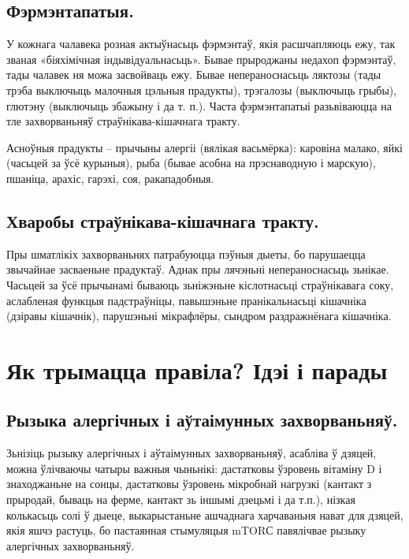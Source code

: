 \subsection{Фэрмэнтапатыя.}
У кожнага чалавека розная актыўнасьць фэрмэнтаў, якія расшчапляюць ежу, так званая «біяхімічная індывідуальнасьць». Бывае прыроджаны недахоп фэрмэнтаў, тады чалавек ня можа засвойваць ежу. Бывае непераноснасьць ляктозы (тады трэба выключыць малочныя цэльныя прадукты), трэгалозы (выключыць грыбы), глютэну (выключыць збажыну і да т. п.). Часта фэрмэнтапатыі разьвіваюцца на тле захворваньняў страўнікава-кішачнага тракту.

Асноўныя прадукты – прычыны алергіі (вялікая васьмёрка): каровіна малако, яйкі (часьцей за ўсё курыныя), рыба (бывае асобна на прэснаводную і марскую), пшаніца, арахіс, гарэхі, соя, ракападобныя.

\subsection{Хваробы страўнікава-кішачнага тракту.}
Пры шматлікіх захворваньнях патрабуюцца пэўныя дыеты, бо парушаецца звычайнае засваеньне прадуктаў. Аднак пры лячэньні непераноснасьць зьнікае. Часьцей за ўсё прычынамі бываюць зьніжэньне кіслотнасьці страўнікавага соку, аслабленая функцыя падстраўніцы, павышэньне пранікальнасьці кішачніка (дзіравы кішачнік), парушэньні мікрафлёры, сындром раздражнёнага кішачніка.

\section{Як трымацца правіла? Ідэі і парады}

\subsection{Рызыка алергічных і аўтаімунных захворваньняў.}
Зьнізіць рызыку алергічных і аўтаімунных захворваньняў, асабліва ў дзяцей, можна ўлічваючы чатыры важныя чыньнікі: дастатковы ўзровень вітаміну D і знаходжаньне на сонцы, дастатковы ўзровень мікробнай нагрузкі (кантакт з прыродай, бываць на ферме, кантакт зь іншымі дзецьмі і да т.п.), нізкая колькасьць солі ў дыеце, выкарыстаньне ашчаднага харчаваньня нават для дзяцей, якія яшчэ растуць, бо пастаянная стымуляцыя mTORС павялічвае рызыку алергічных захворваньняў.

